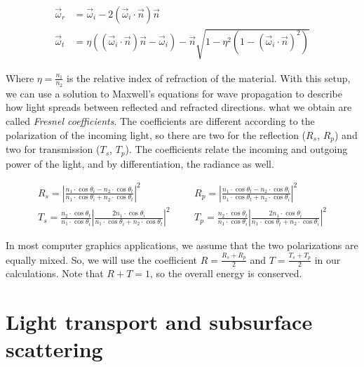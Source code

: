 \begin{equation*}
\begin{split}
\vec{\omega}_r &= \vec{\omega}_i - 2 (\vec{\omega}_i \cdot \vec{n}) \vec{n} \\
\vec{\omega}_t &= \eta ((\vec{\omega}_i \cdot \vec{n}) \vec{n} - \vec{\omega}_i) - \vec{n} \sqrt{1 - \eta^2 (1 - (\vec{\omega}_i \cdot \vec{n}) ^ 2)}
\end{split}
\end{equation*}

Where $\eta = \frac{n_1}{n_2}$ is the relative index of refraction of the material. With this setup, we can use a solution to Maxwell's equations for wave propagation to describe how light spreads between reflected and refracted directions. what we obtain are called \emph{Fresnel coefficients}. The coefficients are different according to the polarization of the incoming light, so there are two for the reflection ($R_s$, $R_p$) and two for transmission ($T_s$, $T_p$). The coefficients relate the incoming and outgoing power of the light, and by differentiation, the radiance as well.

\begin{equation*}
\begin{split}
R_s = \left|\frac{n_1 \cdot \cos\theta_i - n_2 \cdot \cos\theta_t} {n_1 \cdot \cos\theta_i + n_2 \cdot \cos\theta_t}\right|^2 \;\;\;&\;\;\; R_p = \left|\frac{n_1 \cdot \cos\theta_t - n_2 \cdot \cos\theta_i} {n_1 \cdot \cos\theta_t + n_2 \cdot \cos\theta_i}\right|^2\\
T_s = \frac{n_2 \cdot \cos\theta_t}{n_1 \cdot \cos\theta_i} \left|\frac{2 n_1 \cdot \cos\theta_i}{n_1 \cdot \cos\theta_i + n_2 \cdot \cos\theta_t}\right|^2 \;\;\;&\;\;\; T_p = \frac{n_2 \cdot \cos\theta_t}{n_1 \cdot \cos\theta_i}  \left|\frac{2 n_1 \cdot \cos\theta_i}{n_1 \cdot \cos\theta_t + n_2 \cdot \cos\theta_i}\right|^2
\end{split}
\end{equation*}

In most computer graphics applications, we assume that the two polarizations are equally mixed. So, we will use the coefficient $R = \frac{R_s + R_p}{2}$ and $T = \frac{T_s + T_p}{2}$ in our calculations. Note that $R + T = 1$, so the overall energy is conserved.


\section{Light transport and subsurface scattering}
